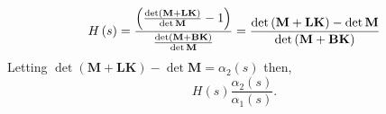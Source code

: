 \[
H\left( s \right) = \frac{{\left( {\frac{{\det \left( {{\bf{M}} + {\bf{LK}}} \right)}}{{\det {\bf{M}}}} - 1} \right)}}{{\frac{{\det \left( {{\bf{M}} + {\bf{BK}}} \right)}}{{\det {\bf{M}}}}}} = \frac{{\det \left( {{\bf{M}} + {\bf{LK}}} \right) - \det {\bf{M}}}}{{\det \left( {{\bf{M}} + {\bf{BK}}} \right)}}
\]
Letting $\det\left(\mathbf{M}+\mathbf{LK}\right)-\det\mathbf{M}=\alpha_2(s)$ then,
\[
H(s)\frac{\alpha_2(s)}{\alpha_1(s)}.
\]




\endinput

